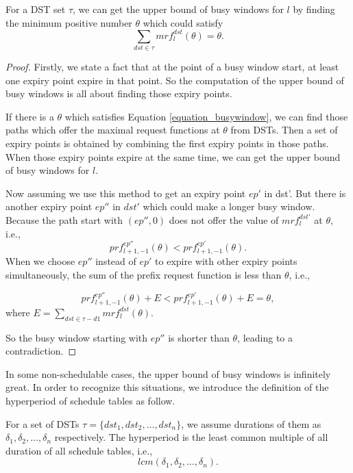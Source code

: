 \documentclass[sigconf]{acmart}
\begin{document}
\begin{lemma}
For a DST set $\tau$, we can get the upper bound of busy windows for $l$ by finding the minimum positive number $\theta$ which could satisfy
\begin{equation}
\sum\limits_{dst\in \tau}mrf^{dst}_l(\theta)=\theta.\label{equation_busywindow}
\end{equation}
\end{lemma}\label{lemma_busywindow}
\begin{proof}
Firstly, we state a fact that at the point of a busy window start, at least one expiry point expire in that point. So the computation of the upper bound of busy windows is all about finding those expiry points.

If there is a $\theta$ which satisfies Equation \ref{equation_busywindow}, we can find those paths which offer the maximal request functions at $\theta$ from DSTs. Then a set of expiry points is obtained by combining the first expiry points in those paths. When those expiry points expire at the same time, we can get the upper bound of busy windows for $l$.

Now assuming we use this method to get an expiry point $ep'$ in dst'. But there is another expiry point $ep''$ in $dst'$ which could make a longer busy window. Because the path start with $(ep'',0)$ does not offer the value of $mrf^{dst'}_l$ at $\theta$, i.e.,
\[prf^{ep''}_{l+1,-1}(\theta)<prf^{ep'}_{l+1,-1}(\theta).\]
When we choose $ep''$ instead of $ep'$ to expire with other expiry points simultaneously, the sum of the prefix request function is less than $\theta$, i.e., 

\begin{equation}
prf^{ep''}_{l+1,-1}(\theta)+E<prf^{ep'}_{l+1,-1}(\theta)+E=\theta, 
\end{equation}
where $E=\sum\limits_{dst\in \tau-d1}mrf^{dst}_l(\theta)$.

So the busy window starting with $ep''$ is shorter than $\theta$, leading to a contradiction.
\end{proof}

In some non-schedulable cases, the upper bound of busy windows is infinitely great. In order to recognize this situations, we introduce the definition of the hyperperiod of schedule tables as follow.
\begin{definition}
For a set of DSTs $\tau=\{dst_1,dst_2,\dots,dst_n\}$, we assume durations of them as $\delta_1,\delta_2,\dots,\delta_n$ respectively. The hyperperiod is the least common multiple of all duration of all schedule tables, i.e., \[lcm(\delta_1,\delta_2,\dots,\delta_n).\]
\end{definition}
\end{document}
